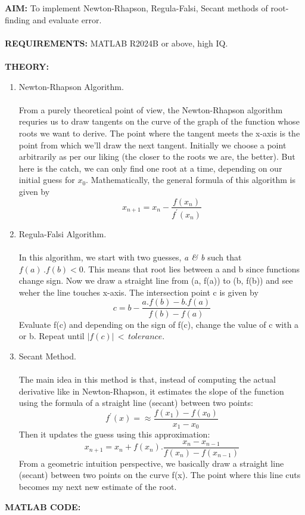 \documentclass[12pt]{report}
\begin{document}
  \noindent\textbf{AIM:} To implement Newton-Rhapson, Regula-Falsi, Secant methods of root-finding and evaluate error. \\ \\
  \textbf{REQUIREMENTS:} MATLAB R2024B or above, high IQ. \\ \\
  \textbf{THEORY:} 
  \begin{enumerate}
    \item Newton-Rhapson Algorithm. \\ \\ 
      From a purely theoretical point of view, the Newton-Rhapson algorithm requries us to draw tangents on the curve of the graph of the function whose roots we want to derive. The point where the tangent meets the x-axis is the point from which we'll draw the next tangent. Initially we choose a point arbitrarily as per our liking (the closer to the roots we are, the better). But here is the catch, we can only find one root at a time, depending on our initial guess for $x_{0}$. Mathematically, the general formula of this algorithm is given by \[ x_{n+1} = x_{n} - \frac{f(x_{n})}{f^{'}(x_{n})} \]  

    \item Regula-Falsi Algorithm. \\ \\
      In this algorithm, we start with two guesses, \textit{a \& b} such that $f(a) \, . f(b) < 0$. This means that root lies between a and b since functions change sign. Now we draw a straight line from (a, f(a)) to (b, f(b)) and see weher the line touches x-axis. The intersection point c is given by \[ c = b - \frac{a.f(b) - b.f(a)}{f(b) - f(a)}\] Evaluate f(c) and depending on the sign of f(c), change the value of c with a or b. Repeat until $|f(c)| \, < \, tolerance$. \\ 
    \item Secant Method. \\ \\
      The main idea in this method is that, instead of computing the actual derivative like in Newton-Rhapson, it estimates the slope of the function using the formula of a straight line (secant) between two points: \[ f^{'}(x) = \approx \frac{f(x_{1}) - f(x_{0})}{x_{1} - x_{0}} \] Then it updates the guess using this approximation: \[ x_{n+1} = x_{n} + f(x_{n}). \frac{x_{n} - x_{n-1}}{f(x_{n}) - f(x_{n-1})} \] From a geometric intuition perspective, we basically draw a straight line (secant) between two points on the curve f(x). The point where this line cuts becomes my next new estimate of the root. \cite{chatgpt}\\
  \end{enumerate}
  \newpage
  \noindent \textbf{MATLAB CODE:} 
   
\end{document}
